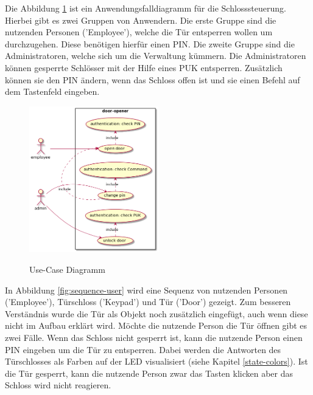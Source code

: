 Die Abbildung \ref{fig:usecase} ist ein Anwendungsfalldiagramm für die Schlosssteuerung. Hierbei gibt es zwei Gruppen von Anwendern. Die erste Gruppe sind die nutzenden Personen ('Employee'), welche die Tür entsperren wollen um durchzugehen. Diese benötigen hierfür einen PIN. Die zweite Gruppe sind die Administratoren, welche sich um die Verwaltung kümmern. Die Administratoren können gesperrte Schlösser mit der Hilfe eines PUK entsperren. Zusätzlich können sie den PIN ändern, wenn das Schloss offen ist und sie einen Befehl auf dem Tastenfeld eingeben. 

\begin{figure}[H]
    \caption{Use-Case Diagramm}
    \centering
    \includegraphics[width=0.5\textwidth]{images/usecase.png}
    \label{fig:usecase}
\end{figure}

In Abbildung \ref{fig:sequence-user} wird eine Sequenz von nutzenden Personen ('Employee'), Türschloss ('Keypad') und Tür ('Door') gezeigt. Zum besseren Verständnis wurde die Tür als Objekt noch zusätzlich eingefügt, auch wenn diese nicht im Aufbau erklärt wird. Möchte die nutzende Person die Tür öffnen gibt es zwei Fälle. Wenn das Schloss nicht gesperrt ist, kann die nutzende Person einen PIN eingeben um die Tür zu entsperren. Dabei werden die Antworten des Türschlosses als Farben auf der LED visualisiert (siehe Kapitel \ref{state-colors}). Ist die Tür gesperrt, kann die nutzende Person zwar das Tasten klicken aber das Schloss wird nicht reagieren.

